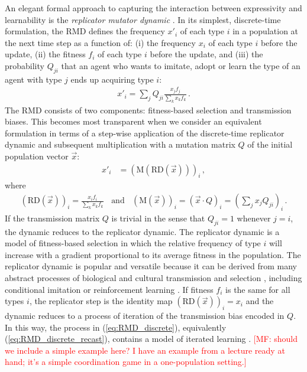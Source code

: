 \documentclass[a4paper]{article}
\newcommand{\mf}[1]{\textcolor{Red}{[MF: #1]}}
\begin{document}
An elegant formal approach to capturing the interaction between expressivity and learnability
is the \emph{replicator mutator dynamic}
\citep{Hofbauer1985:The-Selection-M,nowak+etal:2000,NowakKomarova2001:Evolution-of-Un,hofbauer+sigmund:2003,Nowak2006:Evolutionary-Dy}. In
its simplest, discrete-time formulation, the RMD defines the frequency $x'_i$ of each type $i$
in a population at the next time step as a function of: (i) the frequency $x_i$ of each type
$i$ before the update, (ii) the fitness $f_i$ of each type $i$ before the update, and (iii) the
probability $Q_{ji}$ that an agent who wants to imitate, adopt or learn the type of an agent
with type $j$ ends up acquiring type $i$:
\begin{align}
  \label{eq:RMD_discrete}
  x'_i = \sum_j Q_{ji} \frac{x_jf_j}{\sum_k x_k f_k}\,.
\end{align}
The RMD consists of two components: fitness-based selection and transmission biases. This
becomes most transparent when we consider an equivalent formulation in terms of a step-wise
application of the discrete-time replicator dynamic \citep{TaylorJonker1978:Evolutionary-St}
and subsequent multiplication with a mutation matrix $Q$ of the initial population vector
$\vec{x}$:
\begin{align}
  \label{eq:RMD_discrete_recast}
  x'_i & = (\text{M}(\text{RD}(\vec{x})))_i\,,
\end{align}
where
\begin{align*}
      \left ( \text{RD}(\vec{x}) \right )_i 
         = \frac{x_i f_i}{\sum_k x_k f_k}
 \ \ \ \ \text{and} \ \ \ \ 
  (\text{M}(\vec{x}))_i = (\vec{x} \cdot Q)_i = \left ( \sum_j
          x_j Q_{ji} \right)_i\,.
\end{align*}
If the transmission matrix $Q$ is trivial in the sense that $Q_{ji}=1$ whenever $j=i$, the
dynamic reduces to the replicator dynamic. The replicator dynamic is a model of fitness-based
selection in which the relative frequency of type $i$ will increase with a gradient
proportional to its average fitness in the population. The replicator dynamic is popular and
versatile because it can be derived from many abstract processes of biological and cultural
transmission and selection \citep[for overview and several derivations
see][]{Sandholm2010:Population-Game}, including conditional imitation
\citep[e.g.][]{Helbing1996:A-Stochastic-Be,Schlag1998:Why-Imitate-and} or reinforcement
learning \citep[e.g.][]{BorgersSarin997:Learning-Throug,Beggs2005:On-the-Converge}. If fitness
$f_i$ is the same for all types $i$, the replicator step is the identity map
$ \left ( \text{RD}(\vec{x}) \right )_i = x_i$ and the dynamic reduces to a process of
iteration of the transmission bias encoded in $Q$. In this way, the process in
(\ref{eq:RMD_discrete}), equivalently (\ref{eq:RMD_discrete_recast}), contains a model of
iterated learning \citep{griffiths+kalish:2007}. \mf{should we include a simple example here? I
have an example from a lecture ready at hand; it's a simple coordination game in a
one-population setting.}
\end{document}
